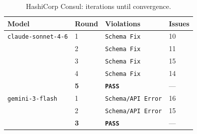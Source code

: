 \documentclass[sigconf,screen]{acmart}
\begin{document}
\begin{table}[t]
    \centering
    \small
    \caption{HashiCorp Consul: iterations until convergence.}
    \label{tab:convergence-consul}
    \begin{tabular}{@{}p{}C{0.15\columnwidth}p{0.30\columnwidth}C{0.1\columnwidth}@{}}
        \toprule
        \textbf{Model} & \textbf{Round} & \textbf{Violations} & \textbf{Issues} \\
        \midrule
        \texttt{claude-sonnet-4-6} & 1 & \texttt{Schema Fix} & 10 \\
                                                    & 2 & \texttt{Schema Fix} & 11 \\
                                                    & 3 & \texttt{Schema Fix} & 15 \\
                                                    & 4 & \texttt{Schema Fix} & 14 \\
                                                    & \textbf{5} & \texttt{\textbf{PASS}} & --- \\
        \texttt{gemini-3-flash} & 1 & \texttt{Schema/API Error} & 16 \\
                                            & 2 & \texttt{Schema/API Error} & 15 \\
                                            & \textbf{3} & \texttt{\textbf{PASS}} & --- \\
        \bottomrule
    \end{tabular}
\end{table}
\end{document}

